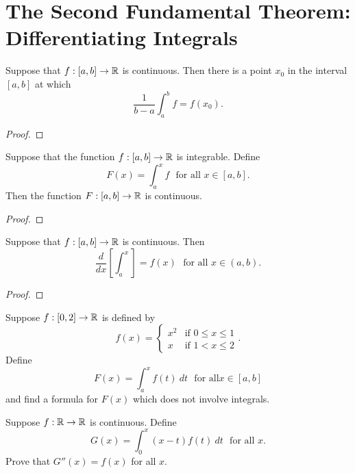 \documentclass[letterpaper, twoside, 12pt]{book}
\begin{document}
\section{The Second Fundamental Theorem: Differentiating Integrals}


\begin{theorem}
  Suppose that \(f:[a,b]\to\mathbb R\) is continuous. Then there is a point \(x_0\)
  in the interval \([a,b]\) at which
  \[
    \frac{1}{b-a}\int_a^b f
      =
    f(x_0)
  .\]
\end{theorem}
\begin{proof}

\end{proof}


\begin{proposition}[6.27]
  Suppose that the function \(f:[a,b]\to\mathbb R\) is integrable. Define
  \[
    F(x) = \int_a^x f
    \text{~~for all~} x\in[a,b]
  .\]
  Then the function \(F:[a,b]\to\mathbb R\) is continuous.
\end{proposition}
\begin{proof}

\end{proof}


\begin{theorem}
  Suppose that \(f:[a,b]\to\mathbb R\) is continuous. Then
  \[
    \frac{d}{dx}\left[\int_a^x\right]
      =
    f(x)
    \text{~~for all~} x\in(a,b)
  .\]
\end{theorem}
\begin{proof}

\end{proof}


\begin{exercise}[2b]
  Suppose \(f:[0,2]\to\mathbb R\) is defined by
  \[
    f(x) =
    \begin{cases}
      x^2 & \text{if } 0\leq x\leq 1 \\
      x   & \text{if } 1< x\leq 2
    \end{cases}
  .\]
  Define
  \[
    F(x)=\int_a^x f(t)~dt
    \text{~~for all} x\in[a,b]
  \]
  and find a formula for \(F(x)\) which does not involve integrals.
\end{exercise}
\begin{solution}

\end{solution}


\begin{exercise}[5]
  Suppose \(f:\mathbb R\to\mathbb R\) is continuous. Define
  \[
    G(x)
      =
    \int_0^x (x-t)f(t)~dt
    \text{~~for all~} x
  .\]
  Prove that \(G''(x)=f(x)\) for all \(x\).
\end{exercise}
\begin{solution}

\end{solution}
\end{document}
